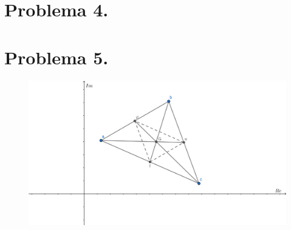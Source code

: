 \documentclass[11pt]{article}
\theoremstyle{Tema} \newtheorem{Tema}{Tema} %
\theoremstyle{Tema} \newtheorem{serie}{Serie}              %
\theoremstyle{Tema} \newtheorem{ejercicio}{Ejercicio}    %
\begin{document}
\section*{\textbf{Problema 4.} }




\section*{\textbf{Problema 5.} }



\begin{figure}[H]
	\centering
	\includegraphics[width=0.7\linewidth]{5}
\end{figure}
\end{document}
